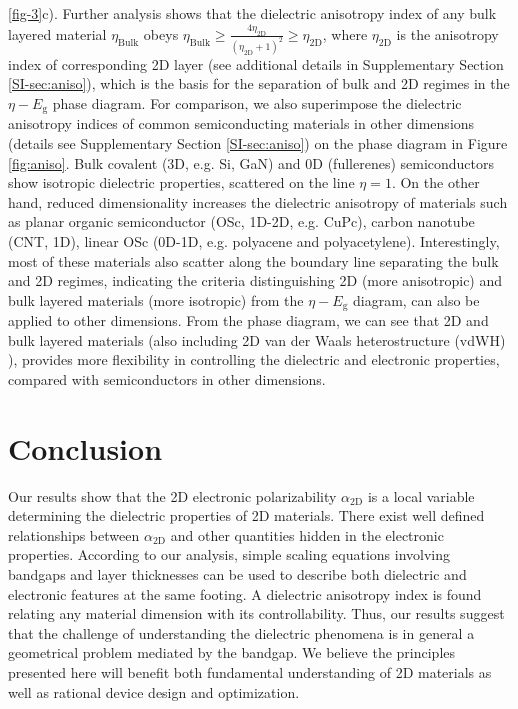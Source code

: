 \ref{fig-3}c). Further analysis shows that the dielectric anisotropy
index of any bulk layered material $\eta_{\mathrm{Bulk}}$ obeys
$\eta_{\mathrm{Bulk}} \geq {\displaystyle \frac{4
    \eta_{\mathrm{2D}}}{(\eta_{\mathrm{2D}}+1)^{2}}} \geq
\eta_{\mathrm{2D}}$, where $\eta_{\mathrm{2D}}$ is the anisotropy
index of corresponding 2D layer (see additional details in
Supplementary Section \ref{SI-sec:aniso}), which is the basis for the
separation of bulk and 2D regimes in the $\eta-E_{\mathrm{g}}$ phase
diagram.  For comparison, we also superimpose the dielectric
anisotropy indices of common semiconducting materials in other
dimensions (details see Supplementary Section \ref{SI-sec:aniso}) on
the phase diagram in Figure \ref{fig:aniso}. Bulk covalent (3D,
e.g. Si, GaN) and 0D (fullerenes) semiconductors show isotropic
dielectric properties, scattered on the line $\eta=1$. On the other
hand, reduced dimensionality increases the dielectric anisotropy of
materials such as planar organic semiconductor (OSc, 1D-2D,
e.g. CuPc), carbon nanotube (CNT, 1D), linear OSc (0D-1D,
e.g. polyacene and polyacetylene). Interestingly, most of these
materials also scatter along the boundary line separating the bulk and
2D regimes, indicating the criteria distinguishing 2D (more
anisotropic) and bulk layered materials (more isotropic) from the
$\eta-E_{\mathrm{g}}$ diagram, can also be applied to other
dimensions. From the phase diagram, we can see that 2D and bulk
layered materials (also including 2D van der Waals heterostructure
(vdWH) \cite{Novoselov_2016}), provides more flexibility in
controlling the dielectric and electronic properties, compared with
semiconductors in other dimensions.

%


\section{Conclusion}

Our results show that the 2D electronic polarizability
$\alpha_{\mathrm{2D}}$ is a local variable determining the dielectric
properties of 2D materials.  There exist well defined relationships
between $\alpha_{\mathrm{2D}}$ and other quantities hidden in the
electronic properties.  According to our analysis, simple scaling
equations involving bandgaps and layer thicknesses can be used to
describe both dielectric and electronic features at the same
footing. A dielectric anisotropy index is found relating any material
dimension with its controllability.  Thus, our results suggest that
the challenge of understanding the dielectric phenomena is in general
a geometrical problem mediated by the bandgap. We believe the
principles presented here will benefit both fundamental understanding
of 2D materials as well as rational device design and optimization.




